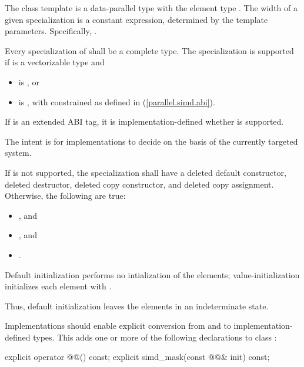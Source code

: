 \pnum
The class template  is a data-parallel type with the element type . The width of a given  specialization is a constant expression, determined by the template parameters. Specifically, .

\pnum
Every specialization of  shall be a complete type. The specialization  is supported if  is a vectorizable type and
\begin{itemize}
  \item {} is , or
  \item {} is , with  constrained as defined in (\ref{parallel.simd.abi}).
\end{itemize}

If  is an extended ABI tag, it is implementation-defined whether  is supported. \begin{note}The intent is for implementations to decide on the basis of the currently targeted system.\end{note}

If  is not supported, the specialization shall have a deleted default constructor, deleted destructor, deleted copy constructor, and deleted copy assignment.
Otherwise, the following are true:
\begin{itemize}
  \item {}, and
  \item {}, and
  \item {}.
\end{itemize}

\pnum
Default initialization performs no intialization of the elements; value-initialization initializes each element with . \begin{note}Thus, default initialization leaves the elements in an indeterminate state.\end{note}

\pnum
Implementations should enable explicit conversion from and to implementation-defined types. This adds one or more of the following declarations to class :

\begin{codeblock}
explicit operator @@() const;
explicit simd_mask(const @@& init) const;
\end{codeblock}

